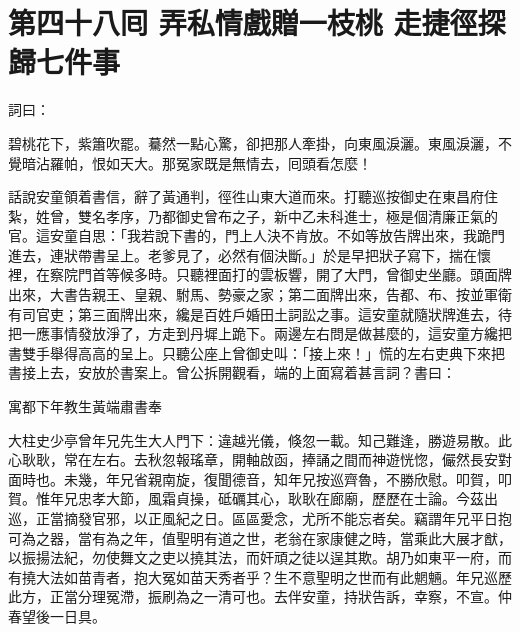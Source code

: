 
\chapter*{第四十八囘 弄私情戲贈一枝桃 走捷徑探歸七件事}


詞曰：

\begin{myquote}
碧桃花下，紫簫吹罷。驀然一點心驚，卻把那人牽掛，向東風淚灑。東風淚灑，不覺暗沾羅帕，恨如天大。那冤家既是無情去，囘頭看怎麼！

\end{myquote}

話說安童領着書信，辭了黃通判，徑徃山東大道而來。打聽巡按御史在東昌府住紮，姓曾，雙名孝序，乃都御史曾布之子，新中乙未科進士，極是個清廉正氣的官。這安童自思：「我若說下書的，門上人決不肯放。不如等放告牌出來，我跪門進去，連狀帶書呈上。老爹見了，必然有個決斷。」於是早把狀子寫下，揣在懷裡，在察院門首等候多時。只聽裡面打的雲板響，開了大門，曾御史坐廳。頭面牌出來，大書告親王、皇親、駙馬、勢豪之家；{}第二面牌出來，告都、布、按並軍衛有司官吏；第三面牌出來，纔是百姓戶婚田土詞訟之事。這安童就隨狀牌進去，待把一應事情發放淨了，方走到丹墀上跪下。兩邊左右問是做甚麼的，這安童方纔把書雙手舉得高高的呈上。只聽公座上曾御史叫：「接上來！」慌的左右吏典下來把書接上去，安放於書案上。曾公拆開觀看，端的上面寫着甚言詞？書曰：

\begin{myquote}[\markfont]
寓都下年教生黃端肅書奉

大柱史少亭曾年兄先生大人門下：違越光儀，倏忽一載。知己難逢，勝遊易散。此心耿耿，常在左右。去秋忽報瑤章，開軸啟函，捧誦之間而神遊恍惚，儼然長安對面時也。未幾，年兄省親南旋，復聞德音，知年兄按巡齊魯，不勝欣慰。叩賀，叩賀。惟年兄忠孝大節，風霜貞操，砥礪其心，耿耿在廊廟，歷歷在士論。今茲出巡，正當摘發官邪，以正風紀之日。區區愛念，尤所不能忘者矣。竊謂年兄平日抱可為之器，當有為之年，值聖明有道之世，老翁在家康健之時，當乘此大展才猷，以振揚法紀，勿使舞文之吏以撓其法，而奸頑之徒以逞其欺。胡乃如東平一府，而有撓大法如苗青者，抱大冤如苗天秀者乎？生不意聖明之世而有此魍魎。年兄巡歷此方，正當分理冤滯，振刷為之一清可也。去伴安童，持狀告訴，幸察，不宣。仲春望後一日具。
\end{myquote}

